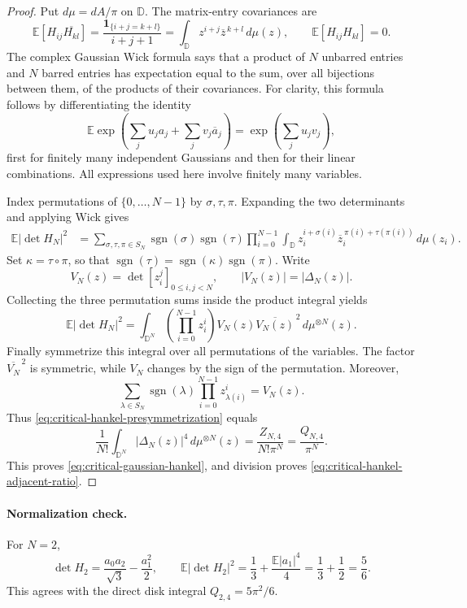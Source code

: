 \documentclass[11pt,a4paper]{article}
\numberwithin{equation}{section}
\theoremstyle{definition}
\theoremstyle{remark}
\begin{document}
\begin{proof}
Put $d\mu=dA/\pi$ on $\mathbb D$. The matrix-entry covariances are
\[
 \mathbb E[H_{ij}\overline{H_{kl}}]
 =\frac{\mathbf1_{\{i+j=k+l\}}}{i+j+1}
 =\int_{\mathbb D}z^{i+j}\overline z^{\,k+l}\,d\mu(z),
 \qquad \mathbb E[H_{ij}H_{kl}]=0.
\]
The complex Gaussian Wick formula says that a product of $N$ unbarred
entries and $N$ barred entries has expectation equal to the sum, over
all bijections between them, of the products of their covariances.
For clarity, this formula follows by differentiating the identity
\[
 \mathbb E\exp\left(\sum_j u_ja_j+\sum_jv_j\overline a_j\right)
 =\exp\left(\sum_j u_jv_j\right),
\]
first for finitely many independent Gaussians and then for their linear
combinations. All expressions used here involve finitely many variables.

Index permutations of $\{0,\ldots,N-1\}$ by $\sigma,\tau,\pi$.
Expanding the two determinants and applying Wick gives
\begin{align*}
 \mathbb E|\det H_N|^2
 &=\sum_{\sigma,\tau,\pi\in S_N}
       \operatorname{sgn}(\sigma)\operatorname{sgn}(\tau)
       \prod_{i=0}^{N-1}
       \int_{\mathbb D}z_i^{i+\sigma(i)}
                \overline z_i^{\,\pi(i)+\tau(\pi(i))}\,d\mu(z_i).
\end{align*}
Set $\kappa=\tau\circ\pi$, so that
$\operatorname{sgn}(\tau)=\operatorname{sgn}(\kappa)
\operatorname{sgn}(\pi)$. Write
\[
 V_N(z)=\det[z_i^j]_{0\leq i,j<N},\qquad |V_N(z)|=|\Delta_N(z)|.
\]
Collecting the three permutation sums inside the product integral yields
\begin{equation}
 \mathbb E|\det H_N|^2
 =\int_{\mathbb D^N}
       \left(\prod_{i=0}^{N-1}z_i^i\right)
       V_N(z)\overline{V_N(z)}^{\,2}
                \,d\mu^{\otimes N}(z).
 \label{eq:critical-hankel-presymmetrization}
\end{equation}
Finally symmetrize this integral over all permutations of the variables.
The factor $\overline{V_N}^{\,2}$ is symmetric, while
$V_N$ changes by the sign of the permutation. Moreover,
\[
 \sum_{\lambda\in S_N}\operatorname{sgn}(\lambda)
           \prod_{i=0}^{N-1}z_{\lambda(i)}^i=V_N(z).
\]
Thus \eqref{eq:critical-hankel-presymmetrization} equals
\[
 \frac1{N!}\int_{\mathbb D^N}|\Delta_N(z)|^4\,d\mu^{\otimes N}(z)
 =\frac{Z_{N,4}}{N!\pi^N}=\frac{Q_{N,4}}{\pi^N}.
\]
This proves \eqref{eq:critical-gaussian-hankel}, and division proves
\eqref{eq:critical-hankel-adjacent-ratio}.
\end{proof}

\paragraph{Normalization check.}
For $N=2$,
\[
 \det H_2=\frac{a_0a_2}{\sqrt3}-\frac{a_1^2}{2},
 \qquad
 \mathbb E|\det H_2|^2=\frac13+\frac{\mathbb E|a_1|^4}{4}
 =\frac13+\frac12=\frac56.
\]
This agrees with the direct disk integral $Q_{2,4}=5\pi^2/6$.
\end{document}
